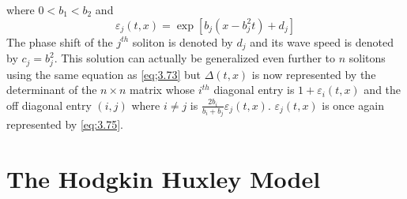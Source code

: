 \documentclass{article}
\numberwithin{equation}{section}
\begin{document}
where $0<b_1<b_2$ and 
\begin{equation}
    \varepsilon_j(t,x)=\exp[b_j(x-b_j^2t)+d_j] \label{eq:3.75}
\end{equation}
The phase shift of the $j^{th}$ soliton is denoted by $d_j$ and its wave speed is denoted by $c_j=b_j^2$. This solution can actually be generalized even further to $n$ solitons using the same equation as \eqref{eq;3.73} but $\Delta (t,x)$ is now represented by the determinant of the $n \times n$ matrix whose $i^{th}$ diagonal entry is $1+\varepsilon_i(t,x)$ and the off diagonal entry $(i,j)$ where $i\neq j$ is $\frac{2b_i}{b_i+b_j}\varepsilon_j(t,x)$. $\varepsilon_j(t,x)$ is once again represented by \eqref{eq:3.75}.
\newpage


\section{The Hodgkin Huxley Model}
\end{document}

